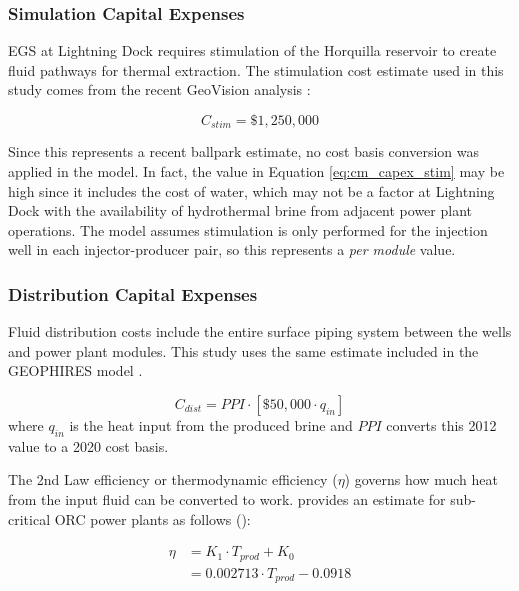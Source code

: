\subsubsection{Simulation Capital Expenses}\label{ch4:cm_stim}
EGS at Lightning Dock requires stimulation of the Horquilla reservoir to create fluid pathways for thermal extraction. The stimulation cost estimate used in this study comes from the recent GeoVision analysis \citep{lowry_geovision_2017}:

\begin{equation}
\label{eq:cm_capex_stim}
    C_{stim} = \$1,250,000
\end{equation}

Since this represents a recent ballpark estimate, no cost basis conversion was applied in the model. In fact, the value in Equation \ref{eq:cm_capex_stim} may be high since it includes the cost of water, which may not be a factor at Lightning Dock with the availability of hydrothermal brine from adjacent power plant operations. The model assumes stimulation is only performed for the injection well in each injector-producer pair, so this represents a \textit{per module} value.

\subsubsection{Distribution Capital Expenses}\label{ch4:cm_capex_dist}
Fluid distribution costs include the entire surface piping system between the wells and power plant modules. This study uses the same estimate included in the GEOPHIRES model \citep{beckers_introducing_2013}.

\begin{equation}
\label{eq:cm_dist}
    C_{dist} = PPI \cdot \left[ \$50,000 \cdot q_{in} \right]
\end{equation}
where $q_{in}$ is the heat input from the produced brine and $PPI$ converts this 2012 value to a 2020 cost basis. 

The 2nd Law efficiency or thermodynamic efficiency ($\eta$) governs how much heat from the input fluid can be converted to work. \citeauthor{beckers_low-temperature_2016} provides an estimate for sub-critical ORC power plants as follows (\citeyear[p.\ 39-41]{beckers_low-temperature_2016}):

\begin{equation}
\begin{aligned}
    \label{eq:2ndlaw_eff}
    \eta &= K_1 \cdot T_{prod} + K_0 \\
         &= 0.002713 \cdot T_{prod} - 0.0918
\end{aligned}
\end{equation}


